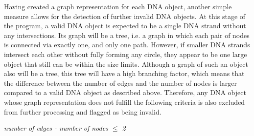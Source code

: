 \documentclass{article}
\begin{document}
Having created a graph representation for each DNA object, another simple measure allows for the detection of further invalid DNA objects. At this stage of the program, a valid DNA object is expected to be a single DNA strand without any intersections. Its graph will be a tree, i.e. a graph in which each pair of nodes is connected via exactly one, and only one path. However, if smaller DNA strands intersect each other without fully forming any circle, they appear to be one large object that still can be within the size limits. Although a graph of such an object also will be a tree, this tree will have a high branching factor, which means that the difference between the number of edges and the number of nodes is larger compared to a valid DNA object as described above. Therefore, any DNA object whose graph representation does not fulfill the following criteria is also excluded from further processing and flagged as being invalid.
\begin{center}\textit{number of edges - number of nodes $\leq$ 2}\end{center}
\end{document}
